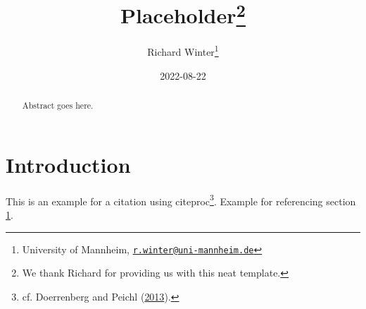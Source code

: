 \documentclass[
  12pt,
]{article}
\title{Placeholder\footnote{We thank Richard for providing us with this neat template.}}
\author{Richard Winter\footnote{University of Mannheim, \href{mailto:r.winter@uni-mannheim.de}{\nolinkurl{r.winter@uni-mannheim.de}}}}
\date{2022-08-22}
\begin{document}
\maketitle
\begin{abstract}
Abstract goes here.
\end{abstract}

\newpage

\hypertarget{intro}{%
\section{Introduction}\label{intro}}

This is an example for a citation using citeproc\footnote{cf. Doerrenberg and Peichl (\protect\hyperlink{ref-doerrenberg2013progressive}{2013}).}. Example for referencing section \ref{intro}.
\end{document}

